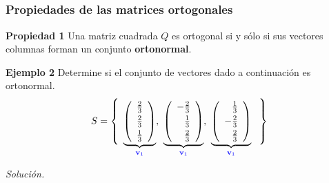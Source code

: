 
\subsection{}

\begin{frame}\frametitle{Propiedades de las matrices ortogonales}


\begin{prop}{\textbf{Propiedad 1}}\justifying
	Una matriz cuadrada $Q$ es ortogonal si y sólo si sus vectores columnas forman un conjunto \textbf{ortonormal}.
\end{prop}	

\begin{ej}{\textbf{Ejemplo 2}} \justifying
	Determine si el conjunto de vectores dado a continuación es ortonormal.
	\[	
	S = 
	\left\{ \begin{array}{c@{\hspace{-\tabcolsep}}} \phantom{.}\\ \phantom{.}\\ \phantom{.} \\ \phantom{.} \end{array} \right.
	\underbrace{\left(\begin{array}{r} \frac{2}{3}\\[1mm] \frac{2}{3}\\[1mm] \frac{1}{3} \\  \end{array} \right)}_{\color{blue}\mathbf{v}_1},\
	\underbrace{\left(\begin{array}{r} -\frac{2}{3}\\[1mm] \frac{1}{3}\\[1mm] \frac{2}{3} \\  \end{array} \right)}_{\color{blue}\mathbf{v}_1},\
	\underbrace{\left(\begin{array}{r} \frac{1}{3}\\[1mm] -\frac{2}{3}\\[1mm] \frac{2}{3} \\  \end{array} \right)}_{\color{blue}\mathbf{v}_1}\
	\left. \begin{array}{c@{\hspace{-\tabcolsep}}} \phantom{.}\\ \phantom{.}\\ \phantom{.} \\ \phantom{.} \end{array} \right\}
	\]
\end{ej}	
\textit{Solución.}

\end{frame}

